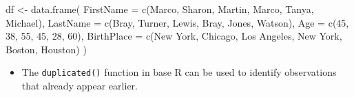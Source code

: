 \documentclass[
  letterpaper,
  DIV=11,
  numbers=noendperiod]{scrreprt}
\newenvironment{Shaded}{\begin{snugshade}}{\end{snugshade}}
\newcommand{\AttributeTok}[1]{\textcolor[rgb]{0.40,0.45,0.13}{#1}}
\newcommand{\CommentTok}[1]{\textcolor[rgb]{0.37,0.37,0.37}{#1}}
\newcommand{\DecValTok}[1]{\textcolor[rgb]{0.68,0.00,0.00}{#1}}
\newcommand{\FunctionTok}[1]{\textcolor[rgb]{0.28,0.35,0.67}{#1}}
\newcommand{\NormalTok}[1]{\textcolor[rgb]{0.00,0.23,0.31}{#1}}
\newcommand{\OtherTok}[1]{\textcolor[rgb]{0.00,0.23,0.31}{#1}}
\newcommand{\SpecialCharTok}[1]{\textcolor[rgb]{0.37,0.37,0.37}{#1}}
\newcommand{\StringTok}[1]{\textcolor[rgb]{0.13,0.47,0.30}{#1}}
\providecommand{\tightlist}{%
  \setlength{\itemsep}{0pt}\setlength{\parskip}{0pt}}\usepackage{longtable,booktabs,array}
\begin{document}
\begin{Shaded}
\begin{Highlighting}[]
\NormalTok{df }\OtherTok{\textless{}{-}} \FunctionTok{data.frame}\NormalTok{(}
  \AttributeTok{FirstName =} \FunctionTok{c}\NormalTok{(}\StringTok{\textquotesingle{}Marco\textquotesingle{}}\NormalTok{, }\StringTok{\textquotesingle{}Sharon\textquotesingle{}}\NormalTok{, }\StringTok{\textquotesingle{}Martin\textquotesingle{}}\NormalTok{, }\StringTok{\textquotesingle{}Marco\textquotesingle{}}\NormalTok{, }\StringTok{\textquotesingle{}Tanya\textquotesingle{}}\NormalTok{, }\StringTok{\textquotesingle{}Michael\textquotesingle{}}\NormalTok{),}
  \AttributeTok{LastName =} \FunctionTok{c}\NormalTok{(}\StringTok{\textquotesingle{}Bray\textquotesingle{}}\NormalTok{, }\StringTok{\textquotesingle{}Turner\textquotesingle{}}\NormalTok{, }\StringTok{\textquotesingle{}Lewis\textquotesingle{}}\NormalTok{, }\StringTok{\textquotesingle{}Bray\textquotesingle{}}\NormalTok{, }\StringTok{\textquotesingle{}Jones\textquotesingle{}}\NormalTok{, }\StringTok{\textquotesingle{}Watson\textquotesingle{}}\NormalTok{),}
  \AttributeTok{Age =} \FunctionTok{c}\NormalTok{(}\DecValTok{45}\NormalTok{, }\DecValTok{38}\NormalTok{, }\DecValTok{55}\NormalTok{, }\DecValTok{45}\NormalTok{, }\DecValTok{28}\NormalTok{, }\DecValTok{60}\NormalTok{),}
  \AttributeTok{BirthPlace =} \FunctionTok{c}\NormalTok{(}\StringTok{\textquotesingle{}New York\textquotesingle{}}\NormalTok{, }\StringTok{\textquotesingle{}Chicago\textquotesingle{}}\NormalTok{, }\StringTok{\textquotesingle{}Los Angeles\textquotesingle{}}\NormalTok{, }\StringTok{\textquotesingle{}New York\textquotesingle{}}\NormalTok{, }\StringTok{\textquotesingle{}Boston\textquotesingle{}}\NormalTok{, }\StringTok{\textquotesingle{}Houston\textquotesingle{}}\NormalTok{)}
\NormalTok{)}
\end{Highlighting}
\end{Shaded}

\begin{itemize}
\tightlist
\item
  The \texttt{duplicated()} function in base R can be used to identify
  observations that already appear earlier.
\end{itemize}

\begin{Shaded}
\end{Shaded}
\end{document}
